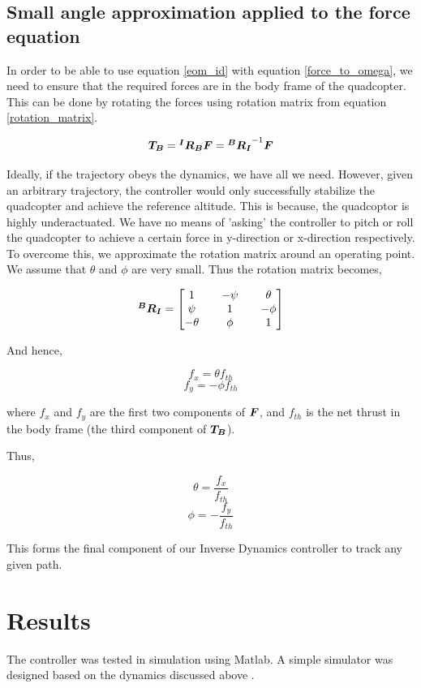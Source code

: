 \documentclass[12pt,fleqn]{article}
\newcommand{\mbm}[1]{\mbox{\boldmath $#1$}}
\begin{document}
\subsection{Small angle approximation applied to the force equation}

In order to be able to use equation \ref{eom_id} with equation
\ref{force_to_omega}, we need to ensure that the required forces are
in the body frame of the quadcopter. This can be done by rotating the
forces using rotation matrix from equation
\ref{rotation_matrix}. 

$$ \mbm{T_B} = \mbm{^IR_B} \mbm{F} = \mbm{^BR_I}^{-1} \mbm{F} $$

Ideally, if the trajectory obeys the dynamics, we have all we
need. However, given an arbitrary trajectory, the controller would
only successfully stabilize the quadcopter and achieve the reference
altitude. This is because, the quadcoptor is highly underactuated. We
have no means of 'asking' the controller to pitch or roll the quadcopter to
achieve a certain force in y-direction or x-direction
respectively.\\

To overcome this, we approximate the rotation matrix
around an operating point. We assume that $\theta$ and
$\phi$ are very small. Thus the rotation matrix becomes,

$$  \mbm{^BR_I} = \begin{bmatrix} 1 && -\psi && \theta \\ \psi && 1 && -\phi \\
  -\theta && \phi && 1 \end{bmatrix} $$

And hence, 

$$ f_x  = \theta f_{th} $$
$$ f_y = -\phi f_{th} $$

where $f_x$ and $f_y$ are the first two components of $\mbm{F}$, and
$f_{th}$ is the net thrust in the body frame (the third component of
$\mbm{T_B}$).

Thus, 

$$ \theta = \frac{f_x}{f_{th}} $$
$$ \phi = -\frac{f_y}{f_{th}} $$

This forms the final component of our Inverse Dynamics controller to
track any given path.

\section{Results}

The controller was tested in simulation using Matlab. A simple simulator
was designed based on the dynamics discussed above \cite{github}.
\end{document}
